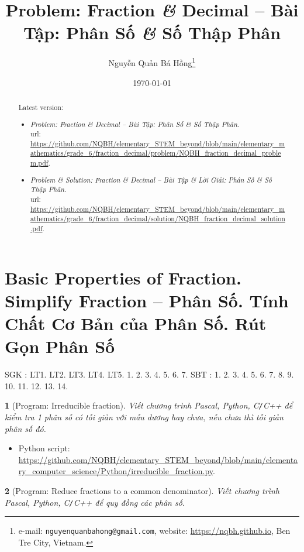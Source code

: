 \documentclass{article}
\title{Problem: Fraction {\it\&} Decimal -- Bài Tập: Phân Số {\it\&} Số Thập Phân}
\author{Nguyễn Quản Bá Hồng\footnote{e-mail: \texttt{nguyenquanbahong@gmail.com}, website: \url{https://nqbh.github.io}, Ben Tre City, Vietnam.}}
\date{\today}
\newtheorem{baitoan}{}
\begin{document}
\maketitle
\begin{abstract}
	Latest version:
	\begin{itemize}
		\item \textit{Problem: Fraction \& Decimal -- Bài Tập: Phân Số {\it\&} Số Thập Phân}.\\{\sc url}: \url{https://github.com/NQBH/elementary_STEM_beyond/blob/main/elementary_mathematics/grade_6/fraction_decimal/problem/NQBH_fraction_decimal_problem.pdf}.
		\item \textit{Problem \& Solution: Fraction \& Decimal -- Bài Tập \& Lời Giải: Phân Số {\it\&} Số Thập Phân}.\\{\sc url}: \url{https://github.com/NQBH/elementary_STEM_beyond/blob/main/elementary_mathematics/grade_6/fraction_decimal/solution/NQBH_fraction_decimal_solution.pdf}.
	\end{itemize}
\end{abstract}
\tableofcontents


\section{Basic Properties of Fraction. Simplify Fraction -- Phân Số. Tính Chất Cơ Bản của Phân Số. Rút Gọn Phân Số}
SGK \cite[Chap. V, \S1, pp. 25--30]{SGK_Toan_6_Canh_Dieu_tap_2}: LT1. LT2. LT3. LT4. LT5. 1. 2. 3. 4. 5. 6. 7. SBT \cite[Chap. V, \S1, pp. 29--32]{SBT_Toan_6_Canh_Dieu_tap_2}: 1. 2. 3. 4. 5. 6. 7. 8. 9. 10. 11. 12. 13. 14.

\begin{baitoan}[{\sf Program}: Irreducible fraction]
	Viết chương trình {\sf Pascal, Python, C{\tt/}C++} để kiểm tra 1 phân số có tối giản với mẫu dương hay chưa, nếu chưa thì tối giản phân số đó.
\end{baitoan}

\begin{itemize}
	\item Python script: \url{https://github.com/NQBH/elementary_STEM_beyond/blob/main/elementary_computer_science/Python/irreducible_fraction.py}.
\end{itemize}

\begin{baitoan}[{\sf Program}: Reduce fractions to a common denominator]
	Viết chương trình {\sf Pascal, Python, C{\tt/}C++} để quy đồng các phân số.
\end{baitoan}
\end{document}

